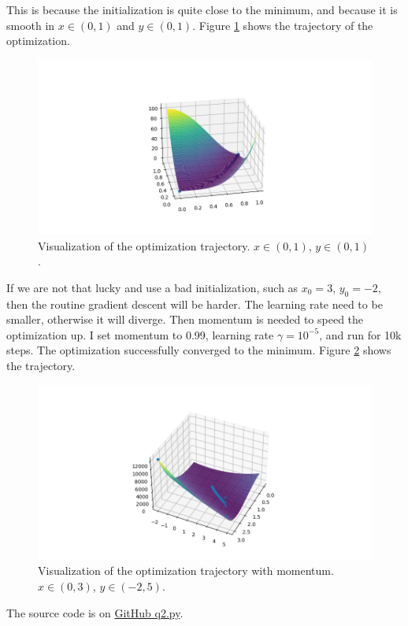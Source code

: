 This is because the initialization is quite close to the minimum,
and because it is smooth in $x \in (0,1)$ and $ y \in (0,1)$.
Figure \ref{fig:routine_gd} shows the trajectory of the optimization.

\begin{figure}[h]
    \includegraphics[width=.8\textwidth]{./routine_gd.png}
    \caption{Visualization of the optimization trajectory. $x \in (0,1)$, $y \in (0,1)$.}
    \label{fig:routine_gd}
\end{figure}

If we are not that lucky and use a bad initialization, such as $x_0 = 3$, $y_0 = -2$,
then the routine gradient descent will be harder.
The learning rate need to be smaller, otherwise it will diverge.
Then momentum is needed to speed the optimization up.
I set momentum to 0.99, learning rate $\gamma=10^{-5}$, and run for 10k steps.
The optimization successfully converged to the minimum.
Figure \ref{fig:gd_m} shows the trajectory.

\begin{figure}[h]
    \includegraphics[width=.8\textwidth]{./gd_m.png}
    \caption{Visualization of the optimization trajectory with momentum. $x \in (0,3)$, $y \in (-2,5)$.}
    \label{fig:gd_m}
\end{figure}

The source code is on \href{https://github.com/liusida/ds2/blob/main/assignment3/code/q2.py}{GitHub q2.py}.

